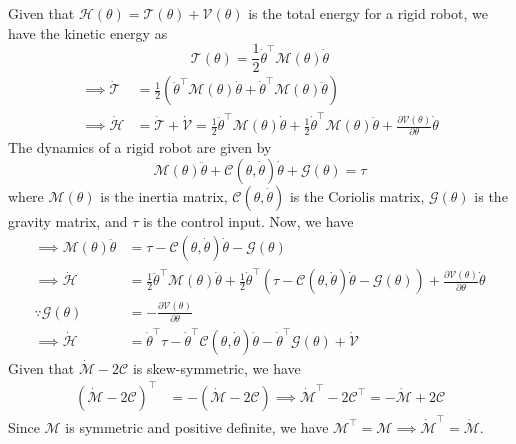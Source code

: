 Given that \( \mathcal{H}(\theta)=\mathcal{T}(\theta)+\mathcal{V}(\theta) \) is the total energy for a rigid robot, we have the kinetic energy as
\begin{equation*}
    \mathcal{T}(\theta)
    =
    \frac{1}{2} \dot{\theta}^{\top} \mathcal{M}(\theta) \dot{\theta}
\end{equation*}
\begin{align*}
    \implies
    \dot{\mathcal{T}}
     & =
    \frac{1}{2} \left( \ddot{\theta}^{\top} \mathcal{M}(\theta) \dot{\theta}+\dot{\theta}^{\top} \mathcal{M}(\theta) \ddot{\theta} \right)
    \\
    \implies
    \dot{\mathcal{H}}
     & =
    \dot{\mathcal{T}}+\dot{\mathcal{V}}
    =
    \frac{1}{2} \ddot{\theta}^{\top} \mathcal{M}(\theta) \dot{\theta}
    +
    \frac{1}{2} \dot{\theta}^{\top} \mathcal{M}(\theta) \ddot{\theta}
    +
    \frac{\partial \mathcal{V}(\theta)}{\partial \theta} \dot{\theta}
\end{align*}
The dynamics of a rigid robot are given by
\begin{equation*}
    \mathcal{M}(\theta) \ddot{\theta}+\mathcal{C}(\theta, \dot{\theta}) \dot{\theta}+\mathcal{G}(\theta)=\tau
\end{equation*}
where \( \mathcal{M}(\theta) \) is the inertia matrix, \( \mathcal{C}(\theta, \dot{\theta}) \) is the Coriolis matrix, \( \mathcal{G}(\theta) \) is the gravity matrix, and \( \tau \) is the control input.
Now, we have
\begin{align*}
    \implies
    \mathcal{M}(\theta) \ddot{\theta}
     & =
    \tau-\mathcal{C}(\theta, \dot{\theta}) \dot{\theta}-\mathcal{G}(\theta)
    \\
    \implies
    \dot{\mathcal{H}}
     & =
    \frac{1}{2} \ddot{\theta}^{\top} \mathcal{M}(\theta) \dot{\theta}
    +
    \frac{1}{2} \dot{\theta}^{\top} \left( \tau-\mathcal{C}(\theta, \dot{\theta}) \dot{\theta}-\mathcal{G}(\theta) \right)
    +
    \frac{\partial \mathcal{V}(\theta)}{\partial \theta} \dot{\theta}
    \\
    \because
    \mathcal{G}(\theta)
     & =
    -\frac{\partial \mathcal{V}(\theta)}{\partial \theta}
    \\
    \implies
    \dot{\mathcal{H}}
     & =
    \dot{\theta}^{\top} \tau-\dot{\theta}^{\top} \mathcal{C}(\theta, \dot{\theta}) \dot{\theta}-\dot{\theta}^{\top} \mathcal{G}(\theta) + \dot{\mathcal{V}}
\end{align*}
Given that \( \dot{\mathcal{M}}-2 \mathcal{C} \) is skew-symmetric, we have
\begin{align*}
    \left( \dot{\mathcal{M}}-2 \mathcal{C} \right)^{\top}
     & =
    -\left( \dot{\mathcal{M}}-2 \mathcal{C} \right)
    \implies
    \dot{\mathcal{M}}^{\top}-2 \mathcal{C}^{\top}
    =
    -\dot{\mathcal{M}}+2 \mathcal{C}
\end{align*}
Since \( \mathcal{M} \) is symmetric and positive definite, we have \( {\mathcal{M}}^{\top} = \mathcal{M} \implies \dot{\mathcal{M}}^{\top} = \dot{\mathcal{M}} \).
